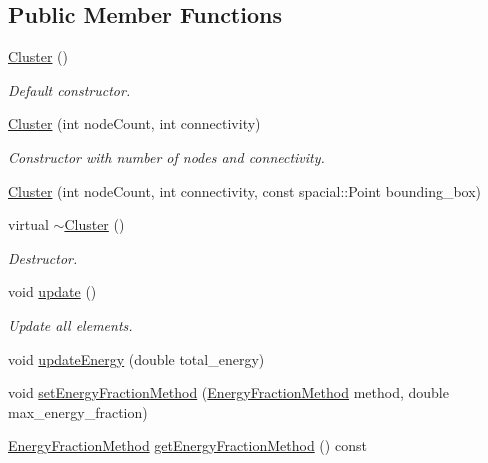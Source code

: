 \subsection*{\-Public \-Member \-Functions}
\begin{DoxyCompactItemize}
\item 
\hyperlink{classcryomesh_1_1structures_1_1Cluster_aacb0e32e4468478035aa56b25538157d}{\-Cluster} ()
\begin{DoxyCompactList}\small\item\em \-Default constructor. \end{DoxyCompactList}\item 
\hyperlink{classcryomesh_1_1structures_1_1Cluster_a090c3af0b1d8851663bf052b7dafc746}{\-Cluster} (int node\-Count, int connectivity)
\begin{DoxyCompactList}\small\item\em \-Constructor with number of nodes and connectivity. \end{DoxyCompactList}\item 
\hyperlink{classcryomesh_1_1structures_1_1Cluster_afcb3841cdbf61803b47b64fe8008e24c}{\-Cluster} (int node\-Count, int connectivity, const spacial\-::\-Point bounding\-\_\-box)
\item 
virtual \hyperlink{classcryomesh_1_1structures_1_1Cluster_ae9d383e6e81f5e354b81d999fed20708}{$\sim$\-Cluster} ()
\begin{DoxyCompactList}\small\item\em \-Destructor. \end{DoxyCompactList}\item 
void \hyperlink{classcryomesh_1_1structures_1_1Cluster_a933d1d7f51cc709ba4a891407b4885e3}{update} ()
\begin{DoxyCompactList}\small\item\em \-Update all elements. \end{DoxyCompactList}\item 
void \hyperlink{classcryomesh_1_1structures_1_1Cluster_a7f44dac6fd0867af668d888e992dc1e2}{update\-Energy} (double total\-\_\-energy)
\item 
void \hyperlink{classcryomesh_1_1structures_1_1Cluster_ac25c418e75f8f9baca1c99f1fe12e0c3}{set\-Energy\-Fraction\-Method} (\hyperlink{classcryomesh_1_1structures_1_1Cluster_a69c420b79675c6ffc9a0df8381ca9497}{\-Energy\-Fraction\-Method} method, double max\-\_\-energy\-\_\-fraction)
\item 
\hyperlink{classcryomesh_1_1structures_1_1Cluster_a69c420b79675c6ffc9a0df8381ca9497}{\-Energy\-Fraction\-Method} \hyperlink{classcryomesh_1_1structures_1_1Cluster_ad24253afeec070daf46182ecc0a85f36}{get\-Energy\-Fraction\-Method} () const 

\end{DoxyCompactItemize}
